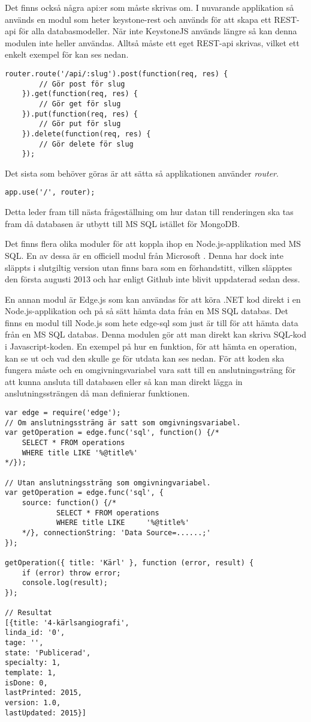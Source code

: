 Det finns också några api:er som måste skrivas om. I nuvarande applikation så används en modul som heter keystone-rest och används för att skapa ett REST-api för alla databasmodeller. När inte KeystoneJS används längre så kan denna modulen inte heller användas. Alltså måste ett eget REST-api skrivas, vilket ett enkelt exempel för kan ses nedan. 

\begin{verbatim}
router.route('/api/:slug').post(function(req, res) {
		// Gör post för slug
	}).get(function(req, res) {
		// Gör get för slug
	}).put(function(req, res) {
		// Gör put för slug
	}).delete(function(req, res) {
		// Gör delete för slug
	});
\end{verbatim}

Det sista som behöver göras är att sätta så applikationen använder \textit{router}.
\begin{verbatim}
app.use('/', router);
\end{verbatim}

Detta leder fram till nästa frågeställning om hur datan till renderingen ska tas fram då databasen är utbytt till MS SQL istället för MongoDB.

Det finns flera olika moduler för att koppla ihop en Node.js-applikation med MS SQL. En av dessa är en officiell modul från Microsoft \cite{sqlMS}. Denna har dock inte släppts i slutgiltig version utan finns bara som en förhandstitt, vilken släpptes den första augusti 2013 och har enligt Github inte blivit uppdaterad sedan dess.

En annan modul är Edge.js som kan användas för att köra .NET kod direkt i en Node.js-applikation och på så sätt hämta data från en MS SQL databas. Det finns en modul till Node.js som hete edge-sql som just är till för att hämta data från en MS SQL databas. Denna modulen gör att man direkt kan skriva SQL-kod i Javascript-koden. En exempel på hur en funktion, för att hämta en operation, kan se ut och vad den skulle ge för utdata kan ses nedan. För att koden ska fungera måste och en omgivningsvariabel vara satt till en anslutningssträng för att kunna ansluta till databasen eller så kan man direkt lägga in anslutningssträngen då man definierar funktionen. 


\begin{verbatim}
var edge = require('edge');
// Om anslutningssträng är satt som omgivningsvariabel.
var getOperation = edge.func('sql', function() {/*
    SELECT * FROM operations
    WHERE title LIKE '%@title%'
*/});

// Utan anslutningssträng som omgivningvariabel.
var getOperation = edge.func('sql', {
	source: function() {/*
    		SELECT * FROM operations
    		WHERE title LIKE	 '%@title%'
	*/}, connectionString: 'Data Source=......;'
});

getOperation({ title: 'Kärl' }, function (error, result) {
    if (error) throw error;
    console.log(result);
});

// Resultat
[{title: '4-kärlsangiografi',
linda_id: '0',
tage: '',
state: 'Publicerad',
specialty: 1,
template: 1,
isDone: 0,
lastPrinted: 2015,
version: 1.0,
lastUpdated: 2015}]

\end{verbatim}


